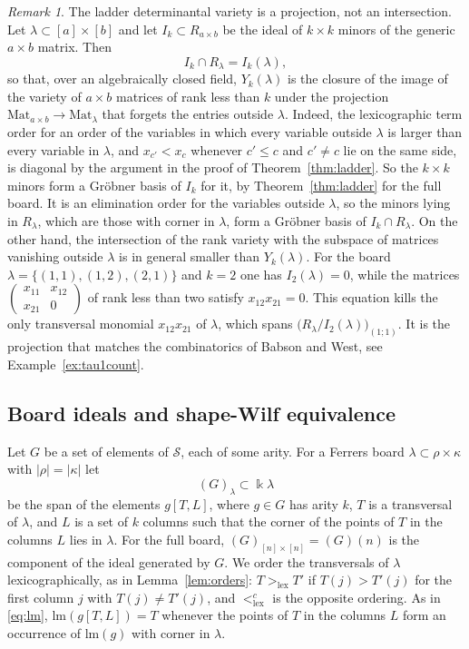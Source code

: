 \documentclass[11pt]{amsart}
\theoremstyle{definition}
\theoremstyle{remark}
\newtheorem{remark}[theorem]{Remark}
\newcommand{\kk}{\Bbbk}
\newcommand{\lm}{\mathrm{lm}}
\newcommand{\cS}{\mathscr{S}}
\newcommand{\lex}{\mathrm{lex}}
\newcommand{\Mat}{\mathrm{Mat}}
\begin{document}
\begin{remark}\label{rem:projection}
The ladder determinantal variety is a projection, not an intersection. Let $\lambda\subset[a]\times[b]$ and let $I_k\subset R_{a\times b}$ be the ideal of $k\times k$ minors of the generic $a\times b$ matrix. Then
\[
I_k\cap R_\lambda=I_k(\lambda),
\]
so that, over an algebraically closed field, $Y_k(\lambda)$ is the closure of the image of the variety of $a\times b$ matrices of rank less than $k$ under the projection $\Mat_{a\times b}\to\Mat_\lambda$ that forgets the entries outside $\lambda$. Indeed, the lexicographic term order for an order of the variables in which every variable outside $\lambda$ is larger than every variable in $\lambda$, and $x_{c'}<x_c$ whenever $c'\le c$ and $c'\ne c$ lie on the same side, is diagonal by the argument in the proof of Theorem~\ref{thm:ladder}. So the $k\times k$ minors form a Gr\"obner basis of $I_k$ for it, by Theorem~\ref{thm:ladder} for the full board. It is an elimination order for the variables outside $\lambda$, so the minors lying in $R_\lambda$, which are those with corner in $\lambda$, form a Gr\"obner basis of $I_k\cap R_\lambda$. On the other hand, the intersection of the rank variety with the subspace of matrices vanishing outside $\lambda$ is in general smaller than $Y_k(\lambda)$. For the board $\lambda=\{(1,1),(1,2),(2,1)\}$ and $k=2$ one has $I_2(\lambda)=0$, while the matrices $\left(\begin{smallmatrix}x_{11}&x_{12}\\x_{21}&0\end{smallmatrix}\right)$ of rank less than two satisfy $x_{12}x_{21}=0$. This equation kills the only transversal monomial $x_{12}x_{21}$ of $\lambda$, which spans $\bigl(R_\lambda/I_2(\lambda)\bigr)_{(1;1)}$. It is the projection that matches the combinatorics of Babson and West, see Example~\ref{ex:tau1count}.
\end{remark}

\subsection{Board ideals and shape-Wilf equivalence}\label{sec:board-ideals}

Let $G$ be a set of elements of $\cS$, each of some arity. For a Ferrers board $\lambda\subset\rho\times\kappa$ with $|\rho|=|\kappa|$ let
\[
(G)_\lambda\subset\kk\lambda
\]
be the span of the elements $g[T,L]$, where $g\in G$ has arity $k$, $T$ is a transversal of $\lambda$, and $L$ is a set of $k$ columns such that the corner of the points of $T$ in the columns $L$ lies in $\lambda$. For the full board, $(G)_{[n]\times[n]}=(G)(n)$ is the component of the ideal generated by $G$. We order the transversals of $\lambda$ lexicographically, as in Lemma~\ref{lem:orders}: $T>_\lex T'$ if $T(j)>T'(j)$ for the first column $j$ with $T(j)\ne T'(j)$, and $<_\lex^c$ is the opposite ordering. As in \eqref{eq:lm}, $\lm(g[T,L])=T$ whenever the points of $T$ in the columns $L$ form an occurrence of $\lm(g)$ with corner in $\lambda$.
\end{document}
